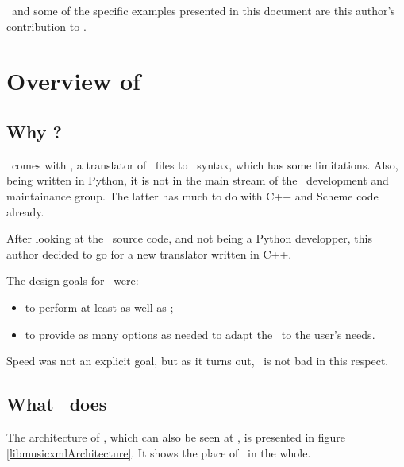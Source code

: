 \documentclass[12pt,a4paper]{article}
\begin{document}
\xmlToLy\ and some of the specific examples presented in this document are this author's contribution to \lib.


\section{Overview of \xmlToLy\ }

\subsection{Why \xmlToLy?}

\lily\ comes with \mxmlToLy, a translator of \mxml\ files to \lily\ syntax, which has some limitations. Also, being written in Python, it is not in the main stream of the \lily\ development and maintainance group. The latter has much to do with C++ and Scheme code already.

After looking at the \mxmlToLy\ source code, and not being a Python developper, this author decided to go for a new translator written in C++.

The design goals for \xmlToLy\ were:
\begin{itemize}
\item to perform at least as well as \mxmlToLy;
\item to provide as many options as needed to adapt the \lcg\ to the user's needs.
\end{itemize}

Speed was not an explicit goal, but as it turns out, \xmlToLy\ is not bad in this respect.

\subsection{What \xmlToLy\ does}

The architecture of \lib, which can also be seen at , is presented in figure \ref{libmusicxmlArchitecture}.
It shows the place of \xmlToLy\ in the whole.
\end{document}
